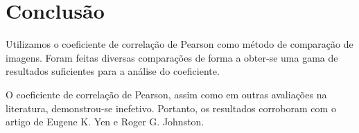 \documentclass[10pt,a4paper]{article}
\begin{document}
\section{Conclusão}
Utilizamos o coeficiente de correlação de Pearson  
 como método de comparação de imagens. Foram feitas diversas
 comparações de forma a obter-se uma gama de resultados suficientes
 para a análise do coeficiente.

O coeficiente de correlação de Pearson, assim como em outras
avaliações na literatura, demonstrou-se inefetivo. Portanto, os
resultados corroboram com o artigo de Eugene K. Yen e
Roger G. Johnston.



\begin{small}
  
\end{small}
\end{document}
